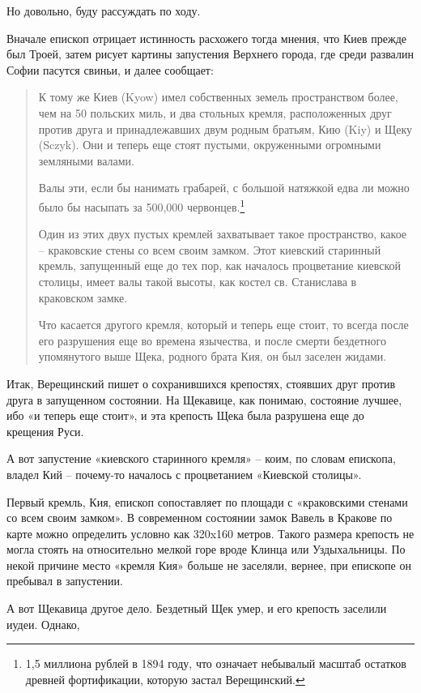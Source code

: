 Но довольно, буду рассуждать по ходу. 

Вначале епископ отрицает истинность расхожего тогда мнения, что Киев прежде был Троей, затем рисует картины запустения Верхнего города, где среди развалин Софии пасутся свиньи, и далее сообщает:

\begin{quotation}
К тому же Киев (Kyow) имел собственных земель пространством более, чем на 50 польских миль, и два стольных кремля, расположенных друг против друга и принадлежавших двум родным братьям, Кию (Kiy) и Щеку (Sczyk). Они и теперь еще стоят пустыми, окруженными огромными земляными валами.

Валы эти, если бы нанимать грабарей, с большой натяжкой едва ли можно было бы насыпать за 500,000 червонцев.\footnote{1,5 миллиона рублей в 1894 году, что означает небывалый масштаб остатков древней фортификации, которую застал Верещинский.}

Один из этих двух пустых кремлей захватывает такое пространство, какое – краковские стены со всем своим замком. Этот киевский старинный кремль, запущенный еще до тех пор, как началось процветание киевской столицы, имеет валы такой высоты, как костел св. Станислава в краковском замке.

Что касается другого кремля, который и теперь еще стоит, то всегда после его разрушения еще во времена язычества, и после смерти бездетного упомянутого выше Щека, родного брата Кия, он был заселен жидами.
\end{quotation}

Итак, Верещинский пишет о сохранившихся крепостях, стоявших друг против друга в запущенном состоянии. На Щекавице, как понимаю, состояние лучшее, ибо «и теперь еще стоит», и эта крепость Щека была разрушена еще до крещения Руси. 

А вот запустение «киевского старинного кремля» – коим, по словам епископа, владел Кий – почему-то началось с процветанием «Киевской столицы». 

Первый кремль, Кия, епископ сопоставляет по площади с «краковскими стенами со всем своим замком». В современном состоянии замок Вавель в Кракове по карте можно определить условно как 320x160 метров. Такого размера крепость не могла стоять на относительно мелкой горе вроде Клинца или Уздыхальницы. По некой причине место «кремля Кия» больше не заселяли, вернее, при епископе он пребывал в запустении.

А вот Щекавица другое дело. Бездетный Щек умер, и его крепость заселили иудеи. Однако,

